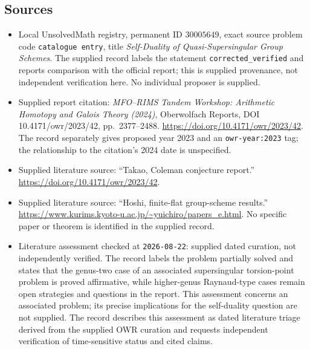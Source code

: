\documentclass[11pt]{article}
\begin{document}
\subsection{Sources}
\begin{itemize}
\item Local UnsolvedMath registry, permanent ID \(30005649\), exact source problem code \texttt{catalogue entry}, title \emph{Self-Duality of Quasi-Supersingular Group Schemes}. The supplied record labels the statement \texttt{corrected\_verified} and reports comparison with the official report; this is supplied provenance, not independent verification here. No individual proposer is supplied.
\item Supplied report citation: \emph{MFO--RIMS Tandem Workshop: Arithmetic Homotopy and Galois Theory (2024)}, Oberwolfach Reports, DOI 10.4171/owr/2023/42, pp.\ 2377--2488. \url{https://doi.org/10.4171/owr/2023/42}. The record separately gives proposed year 2023 and an \texttt{owr-year:2023} tag; the relationship to the citation's 2024 date is unspecified.
\item Supplied literature source: ``Takao, Coleman conjecture report.'' \url{https://doi.org/10.4171/owr/2023/42}.
\item Supplied literature source: ``Hoshi, finite-flat group-scheme results.'' \url{https://www.kurims.kyoto-u.ac.jp/~yuichiro/papers_e.html}. No specific paper or theorem is identified in the supplied record.
\item Literature assessment checked at \texttt{2026-08-22}: supplied dated curation, not independently verified. The record labels the problem partially solved and states that the genus-two case of an associated supersingular torsion-point problem is proved affirmative, while higher-genus Raynaud-type cases remain open strategies and questions in the report. This assessment concerns an associated problem; its precise implications for the self-duality question are not supplied. The record describes this assessment as dated literature triage derived from the supplied OWR curation and requests independent verification of time-sensitive status and cited claims.
\end{itemize}
\end{document}
